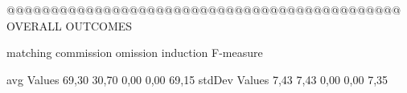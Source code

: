 @@@@@@@@@@@@@@@@@@@@@@@@@@@@@@@@@@@@@@@@@@@@@ OVERALL OUTCOMES

               matching commission   omission  induction  F-measure
               
avg Values      69,30       30,70       0,00      0,00     69,15        
stdDev Values    7,43       7,43       0,00       0,00      7,35        